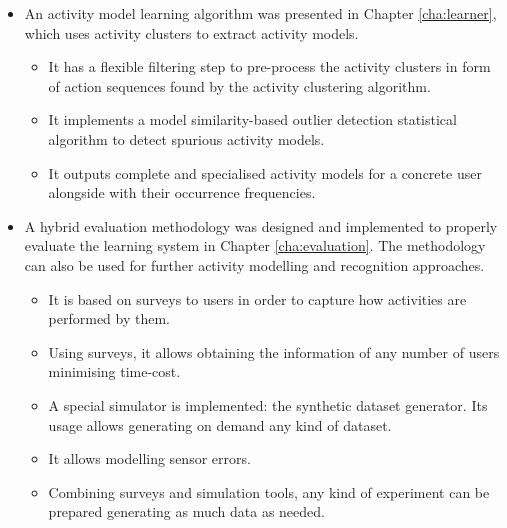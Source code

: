 \begin{itemize}
 \item An activity model learning algorithm was presented in Chapter \ref{cha:learner}, which uses activity clusters to extract activity models.
 \begin{itemize}
  \item It has a flexible filtering step to pre-process the activity clusters in form of action sequences found by the activity clustering algorithm.
  \item It implements a model similarity-based outlier detection statistical algorithm to detect spurious activity models.
  \item It outputs complete and specialised activity models for a concrete user alongside with their occurrence frequencies.
 \end{itemize}

 \item A hybrid evaluation methodology was designed and implemented to properly evaluate the learning system in Chapter \ref{cha:evaluation}. The methodology can also be used for further activity modelling and recognition approaches.
 \begin{itemize}
  \item It is based on surveys to users in order to capture how activities are performed by them.
  \item Using surveys, it allows obtaining the information of any number of users minimising time-cost.
  \item A special simulator is implemented: the synthetic dataset generator. Its usage allows generating on demand any kind of dataset.
  \item It allows modelling sensor errors.
  \item Combining surveys and simulation tools, any kind of experiment can be prepared generating as much data as needed.
 \end{itemize}

\end{itemize}

